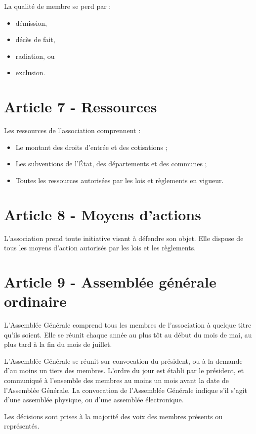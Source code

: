 \documentclass[a4paper,oneside,10pt]{article}
\begin{document}
La qualité de membre se perd par :
\begin{itemize}
\item démission,
\item décès de fait,
\item radiation, ou
\item exclusion.
\end{itemize}

\section*{Article 7 - Ressources}

Les ressources de l'association comprennent :

\begin{itemize}
\item Le montant des droits d'entrée et des cotisations ;
\item Les subventions de l'État, des départements et des communes ;
\item Toutes les ressources autorisées par les lois et règlements en vigueur.
\end{itemize}

\section*{Article 8 - Moyens d'actions}

L'association prend toute initiative visant à défendre son objet. Elle dispose de tous les moyens d'action autorisés par les lois et les règlements.

\section*{Article 9 - Assemblée générale ordinaire}

L'Assemblée Générale comprend tous les membres de l'association à quelque titre qu'ils soient. Elle se réunit chaque année au plus tôt au début du mois de mai, au plus tard à la fin du mois de juillet.


L'Assemblée Générale se réunit sur convocation du président, ou à la demande d'au moins un tiers des membres. L'ordre du jour est établi par le président, et communiqué à l'ensemble des membres au moins un mois avant la date de l'Assemblée Générale. La convocation de l'Assemblée Générale indique s'il s'agit d'une assemblée physique, ou d'une assemblée électronique.


Les décisions sont prises à la majorité des voix des membres présents ou représentés.
\end{document}
